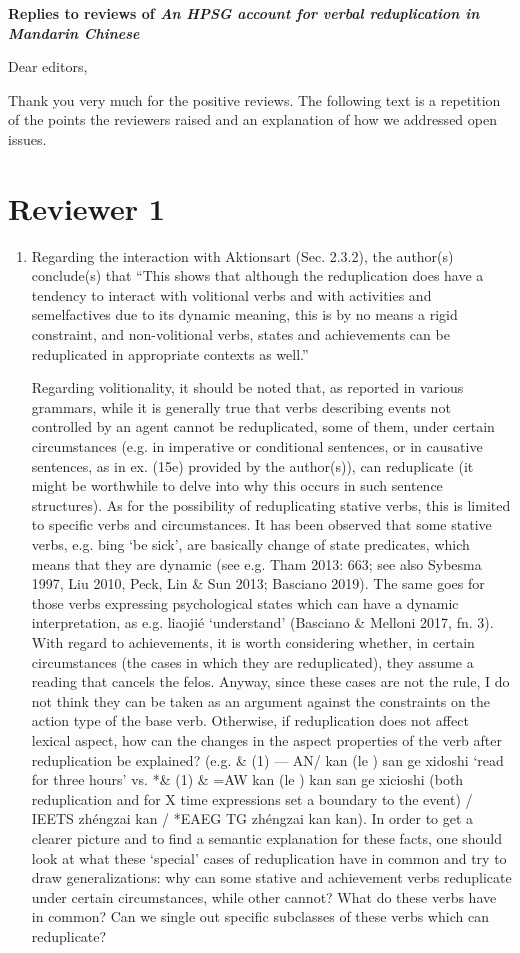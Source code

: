 \documentclass[fleqn,twoside]{article}
\begin{document}
\noindent
{\large\bf Replies to reviews of \emph{An HPSG account for verbal reduplication in Mandarin Chinese}}

\noindent
Dear editors,

Thank you very much for the positive reviews. The following text is a repetition of the points the
reviewers raised and an explanation of how we addressed open issues.

\section{Reviewer 1}\label{sec:1}

\begin{enumerate}
\item
Regarding the interaction with Aktionsart (Sec. 2.3.2), the author(s) conclude(s) that ``This shows
that although the reduplication does have a tendency to interact with volitional verbs and with
activities and semelfactives due to its dynamic meaning, this is by no means a rigid constraint, and
non-volitional verbs, states and achievements can be reduplicated in appropriate contexts as well.''

Regarding volitionality, it should be noted that, as reported in various grammars, while it is generally true that verbs describing events not controlled by an agent cannot be reduplicated, some of them, under certain circumstances (e.g. in imperative or conditional sentences, or in causative  sentences, as in ex. (15e) provided by the author(s)), can reduplicate (it might be worthwhile to delve into why this occurs in such sentence structures). As for the possibility of reduplicating stative verbs, this is limited to specific verbs and circumstances. It has been observed that some stative verbs, e.g. bing ‘be sick’, are basically change of state predicates, which means that they are dynamic (see e.g. Tham 2013: 663; see also Sybesma 1997, Liu 2010, Peck, Lin \& Sun 2013; Basciano 2019). The same goes for those verbs expressing psychological states which can have a dynamic interpretation, as e.g. liaojié `understand' (Basciano \& Melloni 2017, fn. 3). With regard to achievements, it is worth considering whether, in certain circumstances (the cases in which they are reduplicated), they assume a reading that cancels the felos. Anyway, since these cases are not the rule, I do not think they can be taken as an argument against the constraints on the action type of the base verb. Otherwise, if reduplication does not affect lexical aspect, how can the changes in the aspect properties of the verb after reduplication be explained? (e.g. \& (1) — AN/ kan (le ) san ge xidoshi ‘read for three hours’ vs. *\& (1) \& =AW kan (le ) kan san ge xicioshi (both reduplication and for X time expressions set a boundary to the event) / IEETS zhéngzai kan / *EAEG TG zhéngzai kan kan). In order to get a clearer picture and to find a semantic explanation for these facts, one should look at what these ‘special’ cases of reduplication have in common and try to draw generalizations: why can some stative and achievement verbs reduplicate under certain circumstances, while other cannot? What do these verbs have in common? Can we single out specific subclasses of these verbs which can reduplicate?


\end{enumerate}
\end{document}
